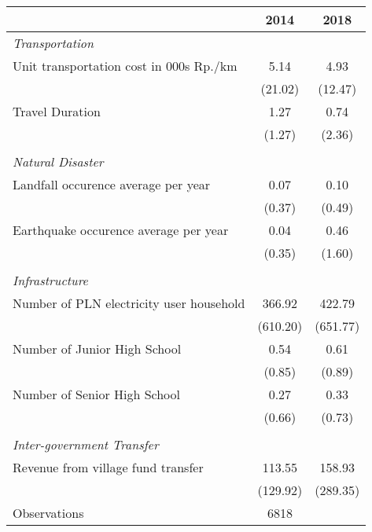 \begin{tabular}{l*{2}{c}}
\hline\hline
                    &        2014&        2018\\
\hline
\emph{Transportation}&            &            \\
\hspace{0.25cm} Unit transportation cost in 000s Rp./km&        5.14&        4.93\\
                    &     (21.02)&     (12.47)\\
\hspace{0.25cm} Travel Duration&        1.27&        0.74\\
                    &      (1.27)&      (2.36)\\
\vspace{0.05em} \\ \emph{Natural Disaster}&            &            \\
\hspace{0.25cm} Landfall occurence average per year&        0.07&        0.10\\
                    &      (0.37)&      (0.49)\\
\hspace{0.25cm} Earthquake occurence average per year&        0.04&        0.46\\
                    &      (0.35)&      (1.60)\\
\vspace{0.05em} \\ \emph{Infrastructure}&            &            \\
\hspace{0.25cm} Number of PLN electricity user household&      366.92&      422.79\\
                    &    (610.20)&    (651.77)\\
\hspace{0.25cm} Number of Junior High School&        0.54&        0.61\\
                    &      (0.85)&      (0.89)\\
\hspace{0.25cm} Number of Senior High School&        0.27&        0.33\\
                    &      (0.66)&      (0.73)\\
\vspace{0.05em} \\ \emph{Inter-government Transfer}&            &            \\
\hspace{0.25cm} Revenue from village fund transfer&      113.55&      158.93\\
                    &    (129.92)&    (289.35)\\
\hline
Observations        &        6818&            \\
\hline\hline
\end{tabular}

